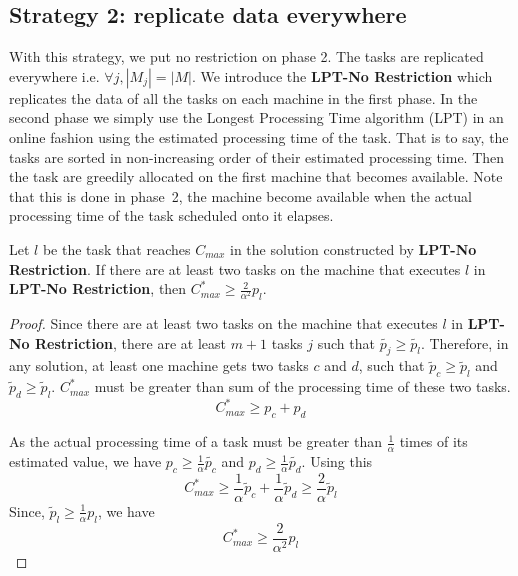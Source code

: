 \documentclass[twocolumn]{svjour3}
\begin{document}
\subsection{Strategy 2: replicate data everywhere}\label{sec5}

With this strategy, we put no restriction on phase 2. The tasks are
replicated everywhere i.e. $\forall j, |M_{j}|=|M|$. We introduce the
\textbf{LPT-No Restriction} which replicates the data of all the tasks
on each machine in the first phase. In the second phase we simply use
the Longest Processing Time algorithm (LPT) in an online fashion using
the estimated processing time of the task. That is to say, the tasks
are sorted in non-increasing order of their estimated processing
time. Then the task are greedily allocated on the first
machine that becomes available. Note that this is done in phase~2,
the machine become available when the actual processing time of
the task scheduled onto it elapses.

\begin{lemma}\label{No Restriction}
  Let $l$ be the task that reaches $C_{max}$ in the solution
  constructed by \textbf{LPT-No Restriction}. If there are at least two
  tasks on the machine that executes $l$ in \textbf{LPT-No Restriction}, then 
  $C_{max}^* \geq {\frac{2}{\alpha^{2}}} p_l$.
\end{lemma}
\begin{proof}
  Since there are at least two tasks on the machine that executes $l$
  in \textbf{LPT-No Restriction}, there are at least $m+1$ tasks $j$
  such that $\tilde{p_j} \geq \tilde{p_l}$. Therefore, in any solution,
  at least one machine gets two tasks $c$ and $d$, such that $\tilde
  p_c \geq \tilde p_l$ and $\tilde p_d \geq \tilde p_l$. $C_{max}^{*}$
  must be greater than sum of the processing time of these two tasks.
   \begin{equation}\nonumber
    C_{max}^{*}\geq p_c + p_d
  \end{equation}	

  As the actual processing time of a task must be greater than
  $\frac{1}{\alpha}$ times of its estimated value, we have $p_c \geq
  \frac{1}{\alpha}\tilde{p_c}$ and $p_d \geq
  \frac{1}{\alpha}\tilde{p_d}$. Using this
  \begin{equation}\nonumber 
    C_{max}^{*} \geq \frac{1}{\alpha}\tilde p_c +  \frac{1}{\alpha} \tilde p_d \geq \frac{2}{\alpha}\tilde p_l
  \end{equation}
Since, $\tilde p_l \geq \frac{1}{\alpha} p_l$, we have
  \begin{equation}\nonumber
    C_{max}^{*} \geq {\frac{2}{\alpha^{2}}} p_l 
  \end{equation}
\end{proof}
\end{document}
